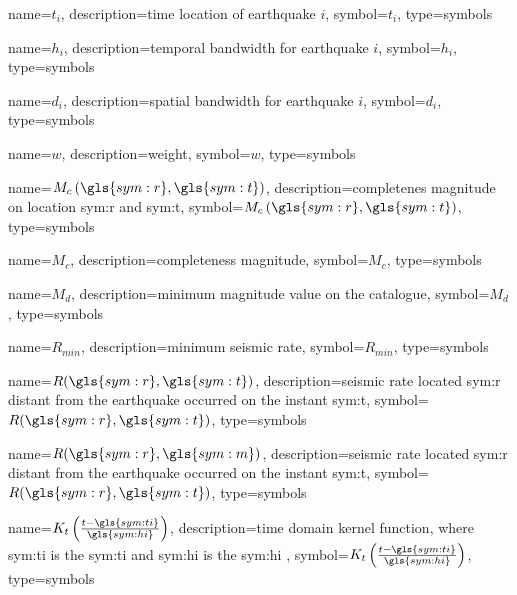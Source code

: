 {
	name={\ensuremath{t_i}},
	description={time location of earthquake $i$},
	symbol={\ensuremath{t_i}},
	type=symbols
}


{
	name={\ensuremath{h_i}},
	description={temporal bandwidth for earthquake $i$},
	symbol={\ensuremath{h_i}},
	type=symbols
}


{
	name={\ensuremath{d_i}},
	description={spatial bandwidth for earthquake $i$},
	symbol={\ensuremath{d_i}},
	type=symbols
}


{
	name={\ensuremath{ w }},
	description={weight},
	symbol={\ensuremath{ w }},
	type=symbols
}


{
	name={\ensuremath{ M_c\left( \gls{sym:r}, \gls{sym:t} \right)  }},
	description={completenes magnitude on location \gls{sym:r} and \gls{sym:t}},
	symbol={\ensuremath{ M_c\left( \gls{sym:r}, \gls{sym:t} \right) }},
	type=symbols
}


{
	name={\ensuremath{M_c}},
	description={completeness magnitude},
	symbol={\ensuremath{M_c}},
	type=symbols
}

{
	name={\ensuremath{M_d}},
	description={minimum magnitude value on the catalogue},
	symbol={\ensuremath{M_d}},
	type=symbols
}


{
	name={\ensuremath{R_{min}}},
	description={minimum seismic rate},
	symbol={\ensuremath{R_{min}}},
	type=symbols
}


{
	name={\ensuremath{R(\gls{sym:r},\gls{sym:t})}},
	description={seismic rate located \gls{sym:r} distant from the earthquake occurred on the instant \gls{sym:t}},
	symbol={\ensuremath{R(\gls{sym:r},\gls{sym:t})}},
	type=symbols
}


{
	name={\ensuremath{R(\gls{sym:r},\gls{sym:m})}},
	description={seismic rate located \gls{sym:r} distant from the earthquake occurred on the instant \gls{sym:t}},
	symbol={\ensuremath{R(\gls{sym:r},\gls{sym:t})}},
	type=symbols
}


{
	name={\ensuremath{K_t \left( \frac{ t - \gls{sym:ti} }{ \gls{sym:hi} } \right) }},
	description={time domain kernel function, where
					\gls{sym:ti} is the \glsdesc{sym:ti} and
					\gls{sym:hi} is the \glsdesc{sym:hi}
				},
	symbol={\ensuremath{K_t \left( \frac{ t - \gls{sym:ti} }{ \gls{sym:hi} } \right)}},
	type=symbols
}

